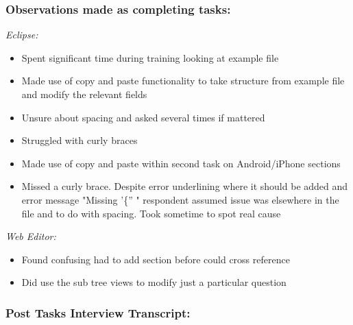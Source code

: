 \subsubsection*{Observations made as completing tasks:}

\emph{Eclipse:}
\begin{itemize}
\item Spent significant time during training looking at example file
\item Made use of copy and paste functionality to take structure from example file and modify the relevant fields
\item Unsure about spacing and asked several times if mattered
\item Struggled with curly braces
\item Made use of copy and paste within second task on Android/iPhone sections
\item Missed a curly brace. Despite error underlining where it should be added and error message "Missing '\{'' " respondent assumed issue was elsewhere in the file and to do with spacing. Took sometime to spot real cause
\end{itemize}
\emph{Web Editor:}
\begin{itemize}
\item Found confusing had to add section before could cross reference
\item Did use the sub tree views to modify just a particular question
\end{itemize}

\subsubsection*{Post Tasks Interview Transcript:}

